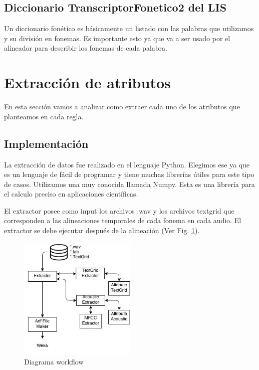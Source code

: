 \documentclass[11pt,a4paper,twoside]{tesis}
\begin{document}
\subsection{Diccionario TranscriptorFonetico2 del LIS}

Un diccionario fonético es básicamente un listado con las palabras que utilizamos y su división en fonemas. Es importante esto ya que va a ser usado por el alineador para describir los fonemas de cada palabra.

\section{Extracción de atributos}

En esta sección vamos a analizar como extraer cada uno de los atributos que planteamos en cada regla.

\subsection{Implementación}

La extracción de datos fue realizado en el lenguaje Python. Elegimos ese ya que es un lenguaje de fácil de programar y tiene muchas librerías útiles para este tipo de casos. Utilizamos una muy conocida llamada Numpy. Esta es una librería para el calculo preciso en aplicaciones científicas.

El extractor posee como input los archivos .wav y los archivos textgrid que corresponden a las alineaciones temporales de cada fonema en cada audio. El extractor se debe ejecutar después de la alineación (Ver Fig. \ref{workflow}). 

\begin{figure}[h!]
    \centerline{\includegraphics[width=0.5\textwidth]{diagrama_workflow} }
    \caption{Diagrama workflow}
    \label{workflow}
\end{figure}
\end{document}
